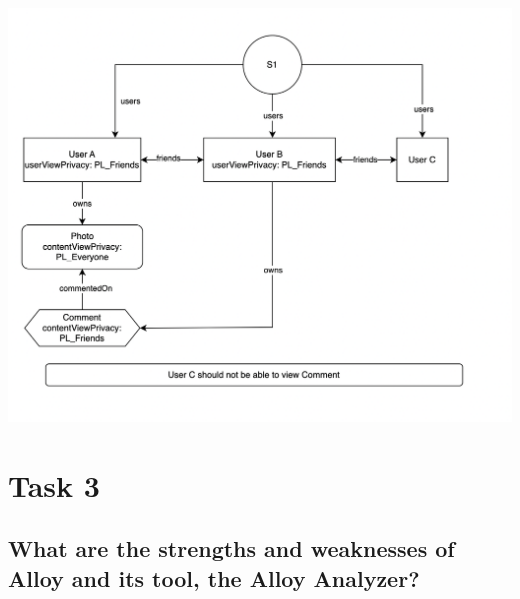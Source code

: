\documentclass[titlepage]{article}
\begin{document}
\includegraphics[width=6in]{images/privacy_violation.png}


\section{Task 3}
\subsection{What are the strengths and weaknesses of Alloy and its tool, the Alloy Analyzer?}
\end{document}
